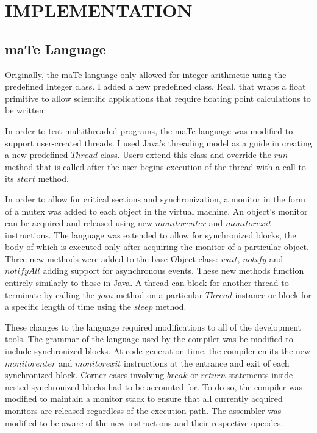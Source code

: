 \chapter{IMPLEMENTATION}
\label{IMPLEMENTATION}

\section{maTe Language}

Originally, the maTe language only allowed for integer arithmetic
using the predefined Integer class.  I added a new predefined class,
Real, that wraps a float primitive to allow scientific applications
that require floating point calculations to be written.

In order to test multithreaded programs, the maTe language was
modified to support user-created threads.  I used Java's threading
model as a guide in creating a new predefined $Thread$ class.  Users
extend this class and override the $run$ method that is called after
the user begins execution of the thread with a call to its $start$
method.

In order to allow for critical sections and synchronization, a monitor
in the form of a mutex was added to each object in the virtual
machine.  An object's monitor can be acquired and released using new
$monitorenter$ and $monitorexit$ instructions.  The language was
extended to allow for synchronized blocks, the body of which is
executed only after acquiring the monitor of a particular object.
Three new methods were added to the base Object class: $wait$,
$notify$ and $notifyAll$ adding support for asynchronous events.
These new methods function entirely similarly to those in Java.  A
thread can block for another thread to terminate by calling the $join$
method on a particular $Thread$ instance or block for a specific
length of time using the $sleep$ method.

These changes to the language required modifications to all of the
development tools.  The grammar of the language used by the compiler
was be modified to include synchronized blocks.  At code generation
time, the compiler emits the new $monitorenter$ and $monitorexit$
instructions at the entrance and exit of each synchronized block.
Corner cases involving $break$ or $return$ statements inside nested
synchronized blocks had to be accounted for.  To do so, the compiler
was modified to maintain a monitor stack to ensure that all currently
acquired monitors are released regardless of the execution path.  The
assembler was modified to be aware of the new instructions and their
respective opcodes.


